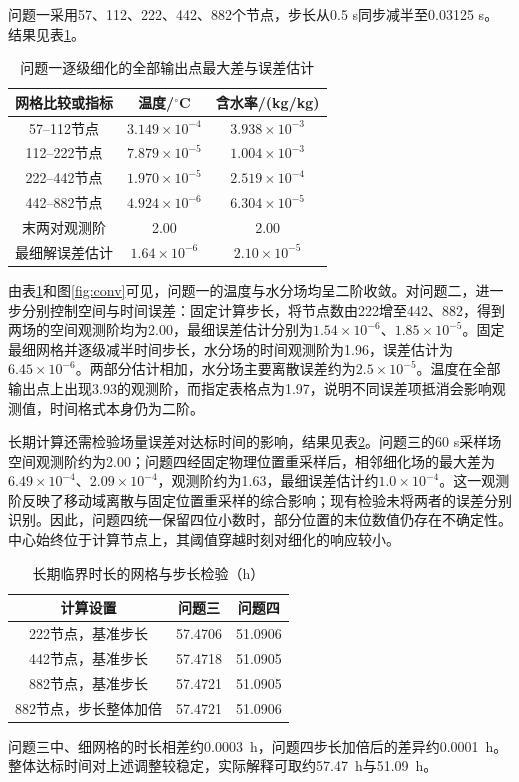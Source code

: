 问题一采用57、112、222、442、882个节点，步长从0.5 s同步减半至0.03125 s。结果见表\ref{tab:conv1}。
\begin{table}[!htbp]\centering
\caption{问题一逐级细化的全部输出点最大差与误差估计}\label{tab:conv1}
\begin{tabular}{ccc}\toprule
网格比较或指标&温度/$^{\circ}$C&含水率/(kg/kg)\\\midrule
57--112节点&$3.149\times10^{-4}$&$3.938\times10^{-3}$\\
112--222节点&$7.879\times10^{-5}$&$1.004\times10^{-3}$\\
222--442节点&$1.970\times10^{-5}$&$2.519\times10^{-4}$\\
442--882节点&$4.924\times10^{-6}$&$6.304\times10^{-5}$\\
末两对观测阶&2.00&2.00\\
最细解误差估计&$1.64\times10^{-6}$&$2.10\times10^{-5}$\\\bottomrule
\end{tabular}\end{table}

由表\ref{tab:conv1}和图\ref{fig:conv}可见，问题一的温度与水分场均呈二阶收敛。对问题二，进一步分别控制空间与时间误差：固定计算步长，将节点数由222增至442、882，得到两场的空间观测阶均为2.00，最细误差估计分别为$1.54\times10^{-6}$\tempunit、$1.85\times10^{-5}$\cunit。固定最细网格并逐级减半时间步长，水分场的时间观测阶为1.96，误差估计为$6.45\times10^{-6}$\cunit。两部分估计相加，水分场主要离散误差约为$2.5\times10^{-5}$\cunit。温度在全部输出点上出现3.93的观测阶，而指定表格点为1.97，说明不同误差项抵消会影响观测值，时间格式本身仍为二阶。

长期计算还需检验场量误差对达标时间的影响，结果见表\ref{tab:longconv}。问题三的60 s采样场空间观测阶约为2.00；问题四经固定物理位置重采样后，相邻细化场的最大差为$6.49\times10^{-4}$、$2.09\times10^{-4}$\cunit，观测阶约为1.63，最细误差估计约$1.0\times10^{-4}$\cunit。这一观测阶反映了移动域离散与固定位置重采样的综合影响；现有检验未将两者的误差分别识别。因此，问题四统一保留四位小数时，部分位置的末位数值仍存在不确定性。中心始终位于计算节点上，其阈值穿越时刻对细化的响应较小。
\begin{table}[!htbp]\centering
\caption{长期临界时长的网格与步长检验（h）}\label{tab:longconv}
\begin{tabular}{ccc}\toprule
计算设置&问题三&问题四\\\midrule
222节点，基准步长&57.4706&51.0906\\
442节点，基准步长&57.4718&51.0905\\
882节点，基准步长&57.4721&51.0905\\
882节点，步长整体加倍&57.4721&51.0906\\\bottomrule
\end{tabular}\end{table}
\FloatBarrier
问题三中、细网格的时长相差约0.0003~h，问题四步长加倍后的差异约0.0001~h。整体达标时间对上述调整较稳定，实际解释可取约57.47~h与51.09~h。

